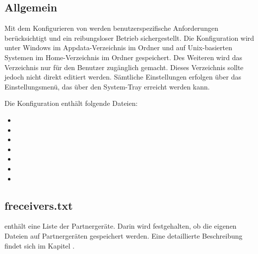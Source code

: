 \subsection{Allgemein}
Mit dem Konfigurieren von \sblit werden benutzerspezifische Anforderungen berücksichtigt und ein reibungsloser Betrieb sichergestellt. Die Konfiguration wird unter Windows im Appdata-Verzeichnis im Ordner  und auf Unix-basierten Systemen im Home-Verzeichnis im Ordner  gespeichert. Des Weiteren wird das Verzeichnis nur für den Benutzer zugänglich gemacht. Dieses Verzeichnis sollte jedoch nicht direkt editiert werden. Sämtliche Einstellungen erfolgen über das Einstellungsmenü, das über den System-Tray erreicht werden kann.

Die Konfiguration enthält folgende Dateien:
\begin{itemize}
	\item {}
	\item {}
	\item {}
	\item {}
	\item {}
	\item {}
	\item {}
\end{itemize}
\subsection{freceivers.txt} \label{freceiverstxt}
 enthält eine Liste der Partnergeräte. Darin wird festgehalten, ob die eigenen Dateien auf Partnergeräten  gespeichert werden. Eine detaillierte Beschreibung findet sich im Kapitel .

